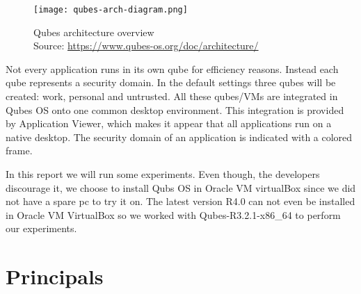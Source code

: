\documentclass[runningheads,a4paper]{article}
\begin{document}
\begin{figure}[h]
  \centering
  \texttt{[image: qubes-arch-diagram.png]}
  \caption{Qubes architecture overview\\
    Source: \protect\url{https://www.qubes-os.org/doc/architecture/}}
  \label{fig:qubesarch}
\end{figure}

Not every application runs in its own qube for efficiency reasons. Instead
each qube represents a security domain. In the default settings three
qubes will be created: work, personal and untrusted. All these
qubes/VMs are integrated in Qubes OS onto one common desktop
environment. This integration is provided by Application Viewer, which
makes it appear that all applications run on a native desktop. The
security domain of an application is indicated with a colored frame.

In this report we will run some experiments. Even though, the developers discourage it, we choose to install Qubs OS in Oracle VM virtualBox since we did not have a spare pc to try it on. The latest version R4.0 can not even be installed in Oracle VM VirtualBox so we worked with Qubes-R3.2.1-x86\_64 to perform our experiments.

\section{Principals} 
\end{document}
